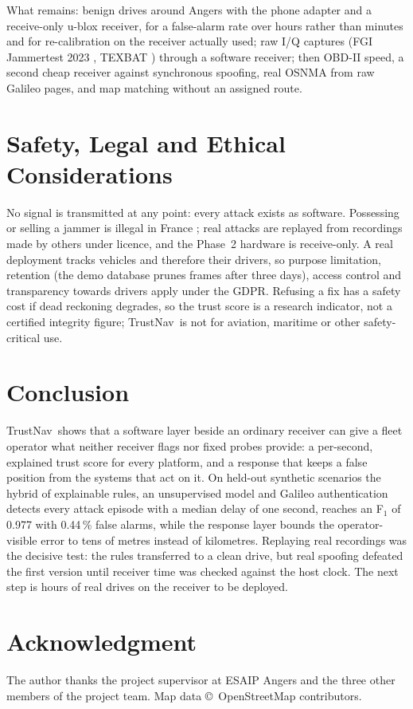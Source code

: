 \documentclass[conference]{IEEEtran}
\newcommand{\sys}{TrustNav}
\begin{document}
What remains: benign drives around Angers with the phone adapter and a receive-only u-blox receiver, for a false-alarm rate over hours rather than minutes and for re-calibration on the receiver actually used; raw I/Q captures (FGI Jammertest 2023 \cite{fgi2023}, TEXBAT \cite{texbat}) through a software receiver; then OBD-II speed, a second cheap receiver against synchronous spoofing, real OSNMA from raw Galileo pages, and map matching without an assigned route.

\section{Safety, Legal and Ethical Considerations}\label{sec:ethics}
No signal is transmitted at any point: every attack exists as software. Possessing or selling a jammer is illegal in France \cite{anfr2024}; real attacks are replayed from recordings made by others under licence, and the Phase~2 hardware is receive-only. A real deployment tracks vehicles and therefore their drivers, so purpose limitation, retention (the demo database prunes frames after three days), access control and transparency towards drivers apply under the GDPR. Refusing a fix has a safety cost if dead reckoning degrades, so the trust score is a research indicator, not a certified integrity figure; \sys\ is not for aviation, maritime or other safety-critical use.

\section{Conclusion}
\sys\ shows that a software layer beside an ordinary receiver can give a fleet operator what neither receiver flags nor fixed probes provide: a per-second, explained trust score for every platform, and a response that keeps a false position from the systems that act on it. On held-out synthetic scenarios the hybrid of explainable rules, an unsupervised model and Galileo authentication detects every attack episode with a median delay of one second, reaches an F$_1$ of 0.977 with 0.44\,\% false alarms, while the response layer bounds the operator-visible error to tens of metres instead of kilometres. Replaying real recordings was the decisive test: the rules transferred to a clean drive, but real spoofing defeated the first version until receiver time was checked against the host clock. The next step is hours of real drives on the receiver to be deployed.

\balance
\section*{Acknowledgment}
The author thanks the project supervisor at ESAIP Angers and the three other members of the project team. Map data \copyright\ OpenStreetMap contributors.
\end{document}

